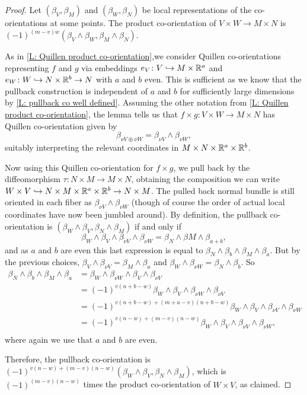 \begin{proof}
	Let $(\beta_V,\beta_M)$ and $(\beta_W,\beta_N)$ be local representations of the co-orientations at some points.
	The product co-orientation of $V \times W \to M \times N$ is $(-1)^{(m-v)w}(\beta_V \wedge \beta_W,\beta_M \wedge \beta_N)$.

	As in \cref{L: Quillen product co-orientation},we consider Quillen co-orientations representing $f$ and $g$ via embeddings $e_V \colon V \hookrightarrow M \times \mathbb{R}^a$ and $e_W \colon W \hookrightarrow N \times \mathbb{R}^b \to N$ with $a$ and $b$ even.
	This is sufficient as we know that the pullback construction is independent of $a$ and $b$ for sufficiently large dimensions by \cref{L: pullback co well defined}.
	Assuming the other notation from \cref{L: Quillen product co-orientation}, the lemma tells us that $f \times g \colon V \times W \to M \times N$ has Quillen co-orientation given by $$\beta_{\nu V \oplus \nu W} = \beta_{\nu V} \wedge \beta_{\nu W},$$
	suitably interpreting the relevant coordinates in $M \times N \times \mathbb{R}^a \times \mathbb{R}^b$.

	Now using this Quillen co-orientation for $f \times g$, we pull back by the diffeomorphism $\tau \colon N \times M \to M \times N$, obtaining the composition we can write $W \times V \hookrightarrow N \times M \times \mathbb{R}^a \times \mathbb{R}^b \to N \times M$.
	The pulled back normal bundle is still oriented in each fiber as $\beta_{\nu V} \wedge \beta_{\nu W}$ (though of course the order of actual local coordinates have now been jumbled around).
	By definition, the pullback co-orientation is $(\beta_W \wedge \beta_V,\beta_N \wedge \beta_M)$ if and only if $$\beta_W \wedge \beta_V \wedge \beta_{\nu V} \wedge \beta_{\nu W} = \beta_N \wedge \beta M \wedge \beta_{a+b},$$
	and as $a$ and $b$ are even this last expression is equal to
	$\beta_N \wedge \beta_b \wedge \beta_M \wedge \beta_{a}.$ But by the previous choices, $\beta_V \wedge \beta_{\nu V} = \beta_M \wedge \beta_a$ and $\beta_W \wedge \beta_{\nu W} = \beta_N \wedge \beta_b$.
	So
	\begin{align*}
		\beta_N \wedge \beta_b \wedge \beta_M \wedge \beta_{a}& = \beta_W \wedge \beta_{\nu W} \wedge \beta_V \wedge \beta_{\nu V}\\
		& = (-1)^{v(n+b-w)}\beta_W \wedge \beta_V \wedge \beta_{\nu W} \wedge \beta_{\nu V}\\
		& = (-1)^{v(n+b-w)+(m+a-v)(n+b-w)}\beta_W \wedge \beta_V \wedge \beta_{\nu V} \wedge \beta_{\nu W}\\
		& = (-1)^{v(n-w)+(m-v)(n-w)}\beta_W \wedge \beta_V \wedge \beta_{\nu V} \wedge \beta_{\nu W},\\
	\end{align*}
	where again we use that $a$ and $b$ are even.

	Therefore, the pullback co-orientation is $(-1)^{v(n-w)+(m-v)(n-w)}(\beta_W \wedge \beta_V,\beta_N \wedge \beta_M)$, which is $(-1)^{(m-v)(n-w)}$ times the product co-orientation of $W \times V$, as claimed.
\end{proof}

